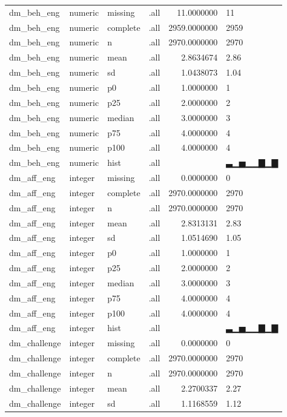 \documentclass[]{msu-thesis}
\theoremstyle{definition}
\theoremstyle{definition}
\theoremstyle{definition}
\theoremstyle{remark}
\begin{document}
\begin{table}
{\begin{tabular}[t]{llllrl}
dm\_beh\_eng & numeric & missing & .all & 11.0000000 & 11\\
dm\_beh\_eng & numeric & complete & .all & 2959.0000000 & 2959\\
dm\_beh\_eng & numeric & n & .all & 2970.0000000 & 2970\\
dm\_beh\_eng & numeric & mean & .all & 2.8634674 & 2.86\\
dm\_beh\_eng & numeric & sd & .all & 1.0438073 & 1.04\\
dm\_beh\_eng & numeric & p0 & .all & 1.0000000 & 1\\
dm\_beh\_eng & numeric & p25 & .all & 2.0000000 & 2\\
dm\_beh\_eng & numeric & median & .all & 3.0000000 & 3\\
dm\_beh\_eng & numeric & p75 & .all & 4.0000000 & 4\\
dm\_beh\_eng & numeric & p100 & .all & 4.0000000 & 4\\
dm\_beh\_eng & numeric & hist & .all &  & ▃▁▅▁▁▇▁▇\\
dm\_aff\_eng & integer & missing & .all & 0.0000000 & 0\\
dm\_aff\_eng & integer & complete & .all & 2970.0000000 & 2970\\
dm\_aff\_eng & integer & n & .all & 2970.0000000 & 2970\\
dm\_aff\_eng & integer & mean & .all & 2.8313131 & 2.83\\
dm\_aff\_eng & integer & sd & .all & 1.0514690 & 1.05\\
dm\_aff\_eng & integer & p0 & .all & 1.0000000 & 1\\
dm\_aff\_eng & integer & p25 & .all & 2.0000000 & 2\\
dm\_aff\_eng & integer & median & .all & 3.0000000 & 3\\
dm\_aff\_eng & integer & p75 & .all & 4.0000000 & 4\\
dm\_aff\_eng & integer & p100 & .all & 4.0000000 & 4\\
dm\_aff\_eng & integer & hist & .all &  & ▃▁▅▁▁▇▁▇\\
dm\_challenge & integer & missing & .all & 0.0000000 & 0\\
dm\_challenge & integer & complete & .all & 2970.0000000 & 2970\\
dm\_challenge & integer & n & .all & 2970.0000000 & 2970\\
dm\_challenge & integer & mean & .all & 2.2700337 & 2.27\\
dm\_challenge & integer & sd & .all & 1.1168559 & 1.12\\

\end{tabular}}
\end{table}
\end{document}
